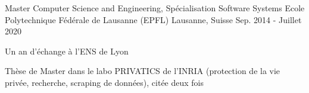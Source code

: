 


\begin{cventries}
	
	\cventry
	{Master Computer Science and Engineering, Spécialisation Software Systems} %
	{Ecole Polytechnique Fédérale de Lausanne (EPFL)} %
	{Lausanne, Suisse} %
	{Sep. 2014 - Juillet 2020} %
	{ %
		\begin{cvitems}
			\item {Un an d'échange à l'ENS de Lyon}
			\item {Thèse de Master dans le labo PRIVATICS de l'INRIA (protection de la vie privée, recherche, scraping de données), citée deux fois}
		\end{cvitems}
	}
	
	
	
	
\end{cventries}